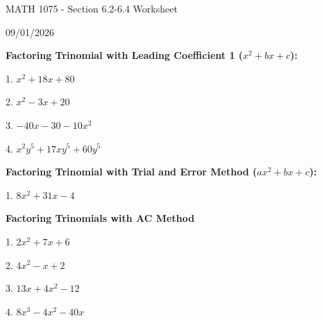 \documentclass[12pt]{article}
\begin{document}
\vspace*{0.5in}

\begin{center}
    {\LARGE MATH 1075 - Section 6.2-6.4 Worksheet}

    \vspace{2em}

    {\large 09/01/2026}
\end{center}

\vspace{2em}

\textbf{\large Factoring Trinomial with Leading Coefficient 1 ($x^{2}+bx+c$):}

\vspace{1.5em}

1. $x^{2}+18x+80$

\vspace{4.5em}

2. $x^{2}-3x+20$

\vspace{4.5em}

3. $-40x-30-10x^{2}$

\vspace{4.5em}

4. $x^{2}y^{5}+17xy^{5}+60y^{5}$

\newpage

\textbf{\large Factoring Trinomial with Trial and Error Method ($ax^{2}+bx+c$):}

\vspace{1.5em}

1. $8x^{2}+31x-4$

\newpage

\textbf{\large Factoring Trinomials with AC Method}

\vspace{1.5em}

1. $2x^{2}+7x+6$

\vspace{4.5em}

2. $4x^{2}-x+2$

\vspace{4.5em}

3. $13x+4x^{2}-12$

\vspace{4.5em}

4. $8x^{3}-4x^{2}-40x$
\end{document}
